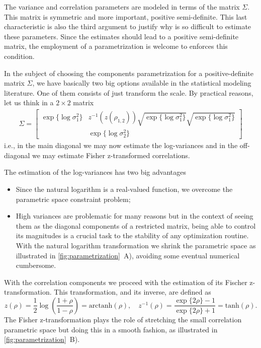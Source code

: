 The variance and correlation parameters are modeled in terms of the
matrix \(\Sigma\). This matrix is symmetric and more important, positive
semi-definite. This last characteristic is also the third argument to
justify why is so difficult to estimate these parameters. Since the
estimates should lead to a positive semi-definite matrix, the employment
of a parametrization is welcome to enforces this condition.

In the subject of choosing the components parametrization for a
positive-definite matrix \(\Sigma\), we have basically two big options
available in the statistical modeling literature. One of them consists
of just transform the scale. By practical reasons, let us think in a
\(2\times 2\) matrix
\begin{align*}
 \Sigma = \begin{bmatrix}
           \exp\{\log\sigma_{1}^{2}\}&
           z^{-1}(z(\rho_{1,2}))
           \sqrt{\exp\{\log\sigma_{1}^{2}\}}
           \sqrt{\exp\{\log\sigma_{1}^{2}\}}\\
           &\exp\{\log\sigma_{2}^{2}\}
          \end{bmatrix}
\end{align*}
i.e., in the main diagonal we may now estimate the log-variances and in
the off-diagonal we may estimate Fisher z-transformed correlations.

The estimation of the log-variances has two big advantages
\begin{itemize}
 \item Since the natural logarithm is a real-valued function, we
       overcome the parametric space constraint problem;

 \item High variances are problematic for many reasons but in the
       context of seeing them as the diagonal components of a restricted
       matrix, being able to control its magnitudes is a crucial task to
       the stability of any optimization routine. With the natural
       logarithm transformation we shrink the parametric space as
       illustrated in \autoref{fig:parametrization}~A), avoiding some
       eventual numerical cumbersome.
\end{itemize}
With the correlation components we proceed with the estimation of its
Fischer z-transformation. This transformation, and its inverse, are
defined as
\[
 z(\rho) = \frac{1}{2}\log\left(\frac{1+\rho}{1-\rho}\right)
         = \text{arctanh}(\rho),\quad
 z^{-1}(\rho) = \frac{\exp\{2\rho\}-1}{\exp\{2\rho\}+1}
             = \text{tanh}(\rho).
\]
The Fisher z-transformation plays the role of stretching the small
correlation parametric space but doing this in a smooth fashion, as
illustrated in \autoref{fig:parametrization}~B).

